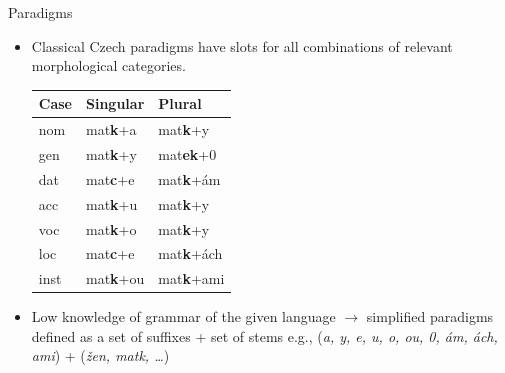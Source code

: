 \documentclass[hyperref={pdfencoding=unicode, unicode=true}, xcolor=dvipsnames]{beamer}
\begin{document}
\begin{frame}{Paradigms}

\begin{itemize}
\item Classical Czech paradigms have slots for all combinations of relevant morphological categories.

\begin{scriptsize}
\begin{center}
\begin{tabular}{lll}
\toprule \bf Case & \bf Singular & \bf Plural \\ \midrule
nom & mat\textbf{k}+a & mat\textbf{k}+y \\
gen & mat\textbf{k}+y & mat\textbf{ek}+0 \\
dat & mat\textbf{c}+e & mat\textbf{k}+ám\\
acc & mat\textbf{k}+u & mat\textbf{k}+y \\
voc & mat\textbf{k}+o & mat\textbf{k}+y \\
loc & mat\textbf{c}+e & mat\textbf{k}+ách \\
inst & mat\textbf{k}+ou & mat\textbf{k}+ami \\
\bottomrule
\end{tabular}
\end{center}
\end{scriptsize}

\item Low knowledge of grammar of the given language $\rightarrow$ simplified paradigms defined as a set of suffixes + set of stems e.g., (\emph{a, y, e, u, o, ou, 0, ám, ách, ami}) + (\emph{žen, matk, \ldots})

\end{itemize}
\end{frame}


%
\end{document}
